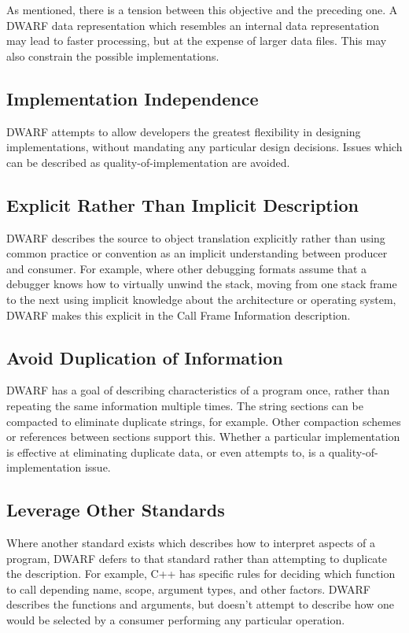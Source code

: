 As mentioned, there is a tension between this objective and
the preceding one.  A DWARF data representation which resembles
an internal data representation may lead to faster processing,
but at the expense of larger data files. This may also constrain
the possible implementations.

\subsection{Implementation Independence}
DWARF attempts to allow developers the greatest flexibility
in designing implementations, without mandating any particular
design decisions. Issues which can be described as
quality-of-implementation are avoided.

\subsection{Explicit Rather Than Implicit Description}
DWARF describes the source to object translation explicitly
rather than using common practice or convention as an implicit
understanding between producer and consumer.  For example, where
other debugging formats assume that a debugger knows how to
virtually unwind the stack, moving from one stack frame to the next using
implicit knowledge about the architecture or operating system,
DWARF makes this explicit in the Call Frame Information description.

\subsection{Avoid Duplication of Information}
DWARF has a goal of describing characteristics of a program once,
rather than repeating the same information multiple times.  The
string sections can be compacted to eliminate duplicate strings,
for example.  Other compaction schemes or references between
sections support this. Whether a particular implementation is
effective at eliminating duplicate data, or even attempts to,
is a quality-of-implementation issue.

\subsection{Leverage Other Standards}
Where another standard exists which describes how to interpret
aspects of a program, DWARF defers to that standard rather than
attempting to duplicate the description.  For example, C++ has
specific rules for deciding which function to call depending
name, scope, argument types, and other factors.  DWARF describes
the functions and arguments, but doesn't attempt to describe
how one would be selected by a consumer performing any particular
operation.

